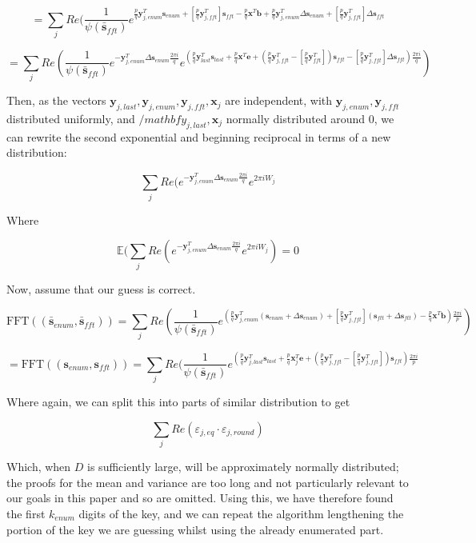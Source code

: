 \documentclass[a4paper, 10pt]{article}
\theoremstyle{definition}
\begin{document}
\[= \sum_j Re(\frac{1}{\psi (\bar{\mathbf{s}}_{fft})}e^{\frac{p}{q}\mathbf{y}^T_{j,enum}\mathbf{s}_{enum} + \left[\frac{p}{q}\mathbf{y}^T_{j,fft}\right]\mathbf{s}_{fft} - \frac{p}{q}\mathbf{x}^T\mathbf{b} + \frac{p}{q}\mathbf{y}^T_{j,enum}\Delta\mathbf{s}_{enum} + \left[\frac{p}{q}\mathbf{y}^T_{j, fft}\right]\Delta \mathbf{s}_{fft}}\]

\[= \sum_j Re(\frac{1}{\psi (\bar{\mathbf{s}}_{fft})}e^{-\mathbf{y}^T_{j,enum}\Delta\mathbf{s}_{enum}\frac{2\pi i}{q}}e^{(\frac{p}{q}\mathbf{y}^T_{last}\mathbf{s}_{last} + \frac{p}{q}\mathbf{x}^T\mathbf{e} + (\frac{p}{q}\mathbf{y}^T_{j,fft} - \left[\frac{p}{q}\mathbf{y}^T_{fft}\right])\mathbf{s}_{fft} - \left[\frac{p}{q}\mathbf{y}^T_{j, fft}\right]\Delta \mathbf{s}_{fft})\frac{2\pi i}{q}})\]

Then, as the vectors $\mathbf{y}_{j, last}, \mathbf{y}_{j,enum}, \mathbf{y}_{j,fft},\mathbf{x}_j$ are independent, with $\mathbf{y}_{j,enum}, \mathbf{y}_{j,fft}$ distributed uniformly, and $/mathbf{y}_{j, last}, \mathbf{x}_j$ normally distributed around $0$, we can rewrite the second exponential and beginning reciprocal in terms of a new distribution:

\[\sum_j Re(e^{-\mathbf{y}^T_{j,enum}\Delta\mathbf{s}_{enum}\frac{2\pi i}{q}}e^{2\pi i W_j}\]

Where 

\[\mathbb{E} (\sum_j Re(e^{-\mathbf{y}^T_{j,enum}\Delta\mathbf{s}_{enum}\frac{2\pi i}{q}}e^{2\pi i W_j}) = 0\]

Now, assume that our guess is correct.

\[\mbox{FFT}((\bar{\mathbf{s}}_{enum}, \bar{\mathbf{s}}_{fft})) = \sum_j Re(\frac{1}{\psi (\bar{\mathbf{s}}_{fft})}e^{(\frac{p}{q}\mathbf{y}^T_{j, enum}(\mathbf{s}_{enum} + \Delta \mathbf{s}_{enum}) + \left[\frac{p}{q}\mathbf{y}^T_{j, fft}\right](\mathbf{s}_{ftt} + \Delta \mathbf{s}_{ftt}) - \frac{p}{q}\mathbf{x}^T\mathbf{b})\frac{2\pi i}{p}})\]

\[=\mbox{FFT}((\mathbf{s}_{enum}, \mathbf{s}_{fft})) = \sum_j Re(\frac{1}{\psi (\bar{\mathbf{s}}_{fft})}e^{(\frac{p}{q}\mathbf{y}^T_{j,last}\mathbf{s}_{last} + \frac{p}{q}\mathbf{x}^T_j\mathbf{e}+(\frac{p}{q}\mathbf{y}^T_{j,fft} - \left[\frac{p}{q}\mathbf{y}^T_{j,fft}\right])\mathbf{s}_{fft})\frac{2\pi i}{p}}\]

Where again, we can split this into parts of similar distribution to get

\[\sum_j Re(\varepsilon _{j,eq} \cdot \varepsilon_{j,round})\]

Which, when $D$ is sufficiently large, will be approximately normally distributed; the proofs for the mean and variance are too long and not particularly relevant to our goals in this paper and so are omitted. Using this, we have therefore found the first $k_{enum}$ digits of the key, and we can repeat the algorithm lengthening the portion of the key we are guessing whilst using the already enumerated part.
\end{document}
